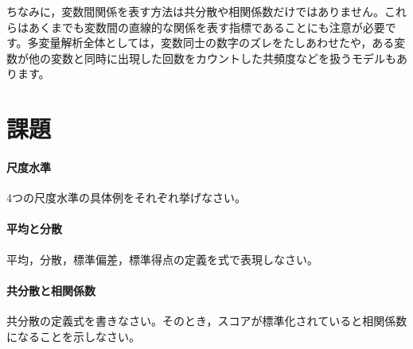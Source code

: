 \documentclass{ltjsbook}
\begin{document}
ちなみに，変数間関係を表す方法は共分散や相関係数だけではありません。これらはあくまでも変数間の直線的な関係を表す指標であることにも注意が必要です。多変量解析全体としては，変数同士の数字のズレをたしあわせたや，ある変数が他の変数と同時に出現した回数をカウントした共頻度などを扱うモデルもあります。


\section{課題}
\paragraph{尺度水準}4つの尺度水準の具体例をそれぞれ挙げなさい。
\paragraph{平均と分散}平均，分散，標準偏差，標準得点の定義を式で表現しなさい。
\paragraph{共分散と相関係数}共分散の定義式を書きなさい。そのとき，スコアが標準化されていると相関係数になることを示しなさい。
\end{document}
